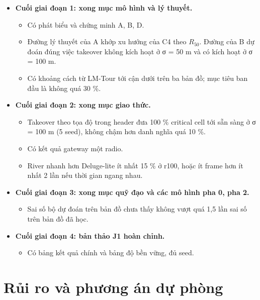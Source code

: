\begin{itemize}
\tightlist
\item
  \textbf{Cuối giai đoạn 1: xong mục mô hình và lý thuyết.}

  \begin{itemize}
  \tightlist
  \item
    Có phát biểu và chứng minh A, B, D.
  \item
    Đường lý thuyết của A khớp xu hướng của C4 theo $R_{50}$. Đường của B dự
    đoán đúng việc takeover không kích hoạt ở σ = 50 m và có kích hoạt ở
    σ = 100 m.
  \item
    Có khoảng cách từ LM-Tour tới cận dưới trên ba bản đồ; mục tiêu ban
    đầu là không quá 30 \%.
  \end{itemize}
\item
  \textbf{Cuối giai đoạn 2: xong mục giao thức.}

  \begin{itemize}
  \tightlist
  \item
    Takeover theo tọa độ trong header đưa 100 \% critical cell tới sẵn
    sàng ở σ = 100 m (5 seed), không chậm hơn danh nghĩa quá 10 \%.
  \item
    Có kết quả gateway một radio.
  \item
    River nhanh hơn Deluge-lite ít nhất 15 \% ở r100, hoặc ít frame hơn
    ít nhất 2 lần nếu thời gian ngang nhau.
  \end{itemize}
\item
  \textbf{Cuối giai đoạn 3: xong mục quỹ đạo và các mô hình pha 0, pha
  2.}

  \begin{itemize}
  \tightlist
  \item
    Sai số bộ dự đoán trên bản đồ chưa thấy không vượt quá 1,5 lần sai
    số trên bản đồ đã học.
  \end{itemize}
\item
  \textbf{Cuối giai đoạn 4: bản thảo J1 hoàn chỉnh.}

  \begin{itemize}
  \tightlist
  \item
    Có bảng kết quả chính và bảng độ bền vững, đủ seed.
  \end{itemize}
\end{itemize}

\section{Rủi ro và phương án dự phòng}

